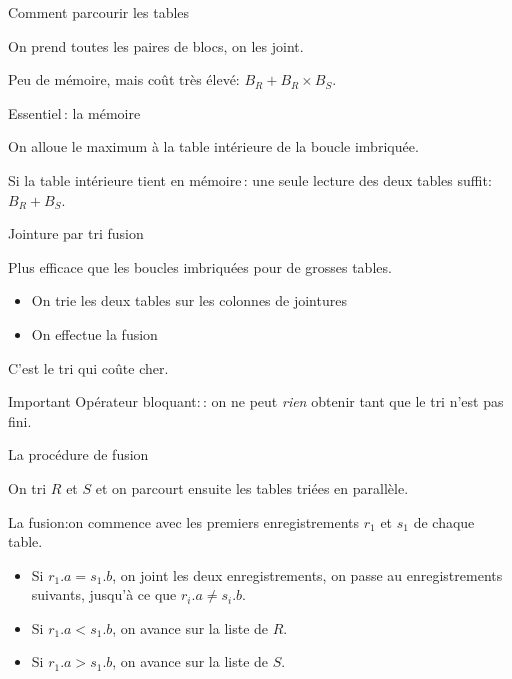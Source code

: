 \begin{frame}{Comment parcourir les tables}

On prend toutes les paires de blocs, on les joint.
\vfill


\vfill

Peu de mémoire, mais coût très élevé: $B_R + B_R \times B_S$.

\end{frame}
\begin{frame}{Essentiel\,: la mémoire}

On alloue le maximum à la table intérieure de la boucle
imbriquée.

\medskip



\medskip

Si la table intérieure tient en mémoire\,: une seule
lecture des deux tables suffit: $B_R + B_S$.

\end{frame}
\begin{frame}{Jointure par tri fusion}

Plus efficace que les boucles imbriquées pour de grosses
tables.

\begin{itemize}

  \item On trie les deux tables sur les colonnes de jointures

  \item On effectue la fusion
\end{itemize}

\vfill

C'est le tri qui coûte cher.

\vfill
\begin{block}{Important}
\alert{Opérateur bloquant:}\,: on ne peut {\em rien} obtenir
tant que le tri n'est pas fini.
\end{block}
\end{frame}
\begin{frame}[fragile]{La procédure de fusion}

On tri $R$ et $S$ et on parcourt ensuite les tables
triées en parallèle.

\vfill

La fusion:on commence avec les premiers enregistrements $r_1$ 
et $s_1$  de chaque 
table. 

\begin{itemize}
   \item Si $r_1.a = s_1.b$, on joint les deux enregistrements,  on passe au
      enregistrements suivants, jusqu'à ce que $r_i.a \not= s_i.b$.
    \item Si $r_1.a < s_1.b$, on avance sur la liste de $R$. 
    \item Si $r_1.a > s_1.b$, on avance sur la liste de $S$. 
\end{itemize}


\end{frame}


